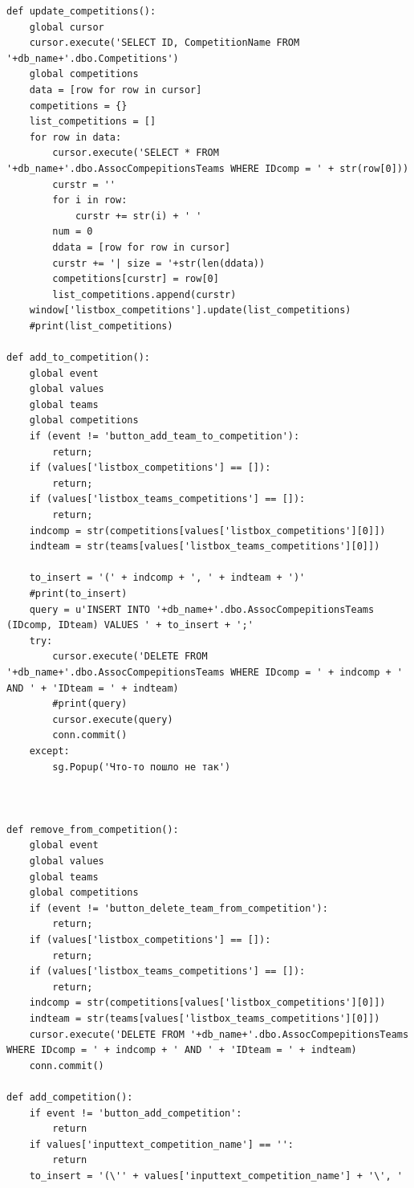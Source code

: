 \documentclass[a4paper,12pt,preview]{report} %
\begin{document}
\begin{verbatim}
def update_competitions():
    global cursor
    cursor.execute('SELECT ID, CompetitionName FROM '+db_name+'.dbo.Competitions')
    global competitions
    data = [row for row in cursor]
    competitions = {}
    list_competitions = []
    for row in data:
        cursor.execute('SELECT * FROM '+db_name+'.dbo.AssocCompepitionsTeams WHERE IDcomp = ' + str(row[0]))
        curstr = ''
        for i in row:
            curstr += str(i) + ' '
        num = 0
        ddata = [row for row in cursor]
        curstr += '| size = '+str(len(ddata))
        competitions[curstr] = row[0]
        list_competitions.append(curstr)
    window['listbox_competitions'].update(list_competitions)
    #print(list_competitions)

def add_to_competition():
    global event
    global values
    global teams
    global competitions
    if (event != 'button_add_team_to_competition'):
        return;
    if (values['listbox_competitions'] == []):
        return;
    if (values['listbox_teams_competitions'] == []):
        return;
    indcomp = str(competitions[values['listbox_competitions'][0]])
    indteam = str(teams[values['listbox_teams_competitions'][0]])

    to_insert = '(' + indcomp + ', ' + indteam + ')'
    #print(to_insert)
    query = u'INSERT INTO '+db_name+'.dbo.AssocCompepitionsTeams (IDcomp, IDteam) VALUES ' + to_insert + ';'
    try:
        cursor.execute('DELETE FROM '+db_name+'.dbo.AssocCompepitionsTeams WHERE IDcomp = ' + indcomp + ' AND ' + 'IDteam = ' + indteam)
        #print(query)
        cursor.execute(query)
        conn.commit()        
    except:
        sg.Popup('Что-то пошло не так')
        
    
    
def remove_from_competition():
    global event
    global values
    global teams
    global competitions
    if (event != 'button_delete_team_from_competition'):
        return;
    if (values['listbox_competitions'] == []):
        return;
    if (values['listbox_teams_competitions'] == []):
        return;
    indcomp = str(competitions[values['listbox_competitions'][0]])
    indteam = str(teams[values['listbox_teams_competitions'][0]])
    cursor.execute('DELETE FROM '+db_name+'.dbo.AssocCompepitionsTeams WHERE IDcomp = ' + indcomp + ' AND ' + 'IDteam = ' + indteam)
    conn.commit()
    
def add_competition():
    if event != 'button_add_competition':
        return
    if values['inputtext_competition_name'] == '':
        return
    to_insert = '(\'' + values['inputtext_competition_name'] + '\', '
    

\end{verbatim}
\end{document}
